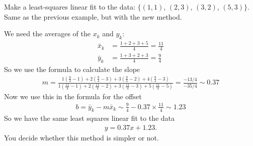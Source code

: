 \exemple{\upline}
{
	Make a least-squares linear fit to the data: $\{ (1,1)$, $(2,3)$, $(3,2)$, $(5,3) \}$. Same as the previous example, but with the new method.
	
	\noindent We need the averages of the $x_k$ and $y_k$:
	\begin{align*}
	\bar{x}_k &= \frac{1+2+3+5}{4} = \frac{11}{4} \\
	\bar{y}_k &= \frac{1+3+2+3}{4} = \frac{9}{4} 
	\end{align*}
	So we use the formula to calculate the slope
	\begin{align*}
	m   = \frac{1(\frac{9}{4}-1)+2(\frac{9}{4}-3)+3(\frac{9}{4}-2)+4(\frac{9}{4}-3)}{1(\frac{11}{4}-1)+2(\frac{11}{4}-2)+3(\frac{11}{4}-3)+5(\frac{11}{4}-5)} = \frac{-13/4}{-35/4} \sim 0.37
	\end{align*}
	Now we use this in the formula for the offset
	\begin{align*}
	b = \bar{y}_k - m \bar{x}_k \sim \frac{9}{4}  - 0.37 \times \frac{11}{4} \sim 1.23
	\end{align*}
	So we have the same least squares linear fit to the data
	\begin{align*}
	y = 0.37 x + 1.23.
	\end{align*}
	You decide whether this method is simpler or not.
}{\downline}


